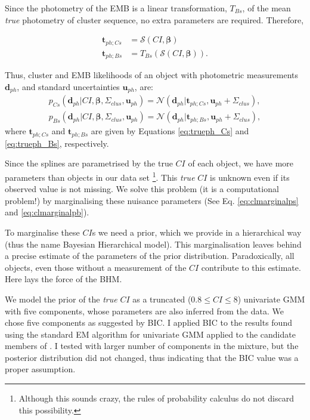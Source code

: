 Since the photometry of the EMB is a linear transformation, $T_{Bs}$, of the mean \emph{true} photometry of cluster sequence, no extra parameters are required. Therefore, 

\begin{align}
\boldsymbol{t}_{ph;Cs} &= \boldsymbol{\mathcal{S}}(CI, \boldsymbol{\beta}) \label{eq:trueph_Cs}\\
\boldsymbol{t}_{ph;Bs} &=T_{Bs}( \boldsymbol{\mathcal{S}}(CI, \boldsymbol{\beta})).
\label{eq:trueph_Bs}
\end{align}

Thus, cluster and EMB likelihoods of an object with photometric measurements $\mathbf{d}_{ph}$, and standard uncertainties $\mathbf{u}_{ph}$, are:
\begin{align}
\label{eq:lik-seq}
 p_{Cs}(\mathbf{d}_{ph}| CI, \boldsymbol{\beta},\Sigma_{clus},\mathbf{u}_{ph})={\mathcal{N}}(\mathbf{d}_{ph}|\boldsymbol{t}_{ph;Cs}, \mathbf{u}_{ph}+\Sigma_{clus}),\nonumber \\
p_{Bs}(\mathbf{d}_{ph}| CI, \boldsymbol{\beta},\Sigma_{clus}, \mathbf{u}_{ph})={\mathcal{N}}(\mathbf{d}_{ph}|\boldsymbol{t}_{ph;Bs}, \mathbf{u}_{ph}+\Sigma_{clus}),
\end{align}
where $\boldsymbol{t}_{ph;Cs}$ and $\boldsymbol{t}_{ph;Bs}$ are given by Equations \ref{eq:trueph_Cs} and \ref{eq:trueph_Bs}, respectively.

Since the splines are parametrised by the true $CI$ of each object, we have more parameters than objects in our data set \footnote{Although this sounds crazy, the rules of probability calculus do not discard this possibility.}. This \emph{true} $CI$ is unknown even if its observed value is not missing. We solve this problem (it is a computational problem!) by marginalising these nuisance parameters (See Eq. \ref{eq:clmarginalps} and \ref{eq:clmarginalpb}). 

To marginalise these $CI$s we need a prior, which we provide in a hierarchical way (thus the name Bayesian Hierarchical model). This marginalisation leaves behind a precise estimate of the parameters of the prior distribution. Paradoxically, all objects, even those without a measurement of the $CI$ contribute to this estimate. Here lays the force of the BHM.

We model the prior of the \emph{true} $CI$ as a truncated ($0.8\leq CI \leq8$) univariate GMM with five components, whose parameters are also inferred from the data. We chose five components as suggested by BIC. I applied BIC to the results found using the standard EM algorithm for univariate GMM applied to the candidate members of \citet{Bouy2015}. I tested with larger number of components in the mixture, but the posterior distribution did not changed, thus indicating that the BIC value was a proper assumption.

